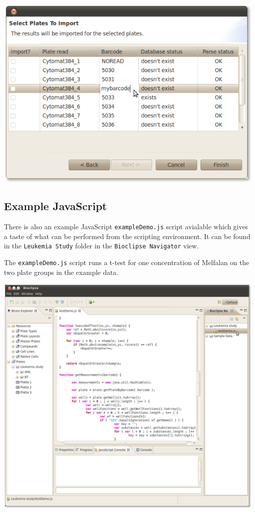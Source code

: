\documentclass[12pt, a4paper, twoside, openany]{article}
\begin{document}
    \begin{center}
        \includegraphics[scale=1.2]{images/changeBarcode.png}
    \end{center}
    \newpage

    \subsection*{Example JavaScript}
    There is also an example JavaScript \texttt{exampleDemo.js} script
    avialable which gives a taste of what can be performed from the scripting
    environment. It can be found in the \texttt{Leukemia Study} folder in the
    \texttt{Bioclipse Navigator} view.

    The \texttt{exampleDemo.js} script runs a t-test for one concentration of
    Melfalan on the two plate groups in the example data.

    \begin{center}
        \includegraphics[scale=1.2]{images/testDemo.png}
    \end{center}
\end{document}
